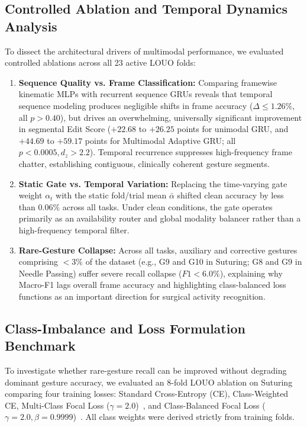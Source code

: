 \documentclass[10pt,journal]{IEEEtran}
\begin{document}
\subsection{Controlled Ablation and Temporal Dynamics Analysis}
To dissect the architectural drivers of multimodal performance, we evaluated controlled ablations across all 23 active LOUO folds:
\begin{enumerate}
    \item \textbf{Sequence Quality vs. Frame Classification:} Comparing framewise kinematic MLPs with recurrent sequence GRUs reveals that temporal sequence modeling produces negligible shifts in frame accuracy ($\Delta \le 1.26\%$, all $p > 0.40$), but drives an overwhelming, universally significant improvement in segmental Edit Score ($+22.68$ to $+26.25$ points for unimodal GRU, and $+44.69$ to $+59.17$ points for Multimodal Adaptive GRU; all $p < 0.0005, d_z > 2.2$). Temporal recurrence suppresses high-frequency frame chatter, establishing contiguous, clinically coherent gesture segments.
    \item \textbf{Static Gate vs. Temporal Variation:} Replacing the time-varying gate weight $\alpha_t$ with the static fold/trial mean $\bar{\alpha}$ shifted clean accuracy by less than $0.06\%$ across all tasks. Under clean conditions, the gate operates primarily as an availability router and global modality balancer rather than a high-frequency temporal filter.
    \item \textbf{Rare-Gesture Collapse:} Across all tasks, auxiliary and corrective gestures comprising $<3\%$ of the dataset (e.g., G9 and G10 in Suturing; G8 and G9 in Needle Passing) suffer severe recall collapse ($F1 < 6.0\%$), explaining why Macro-F1 lags overall frame accuracy and highlighting class-balanced loss functions as an important direction for surgical activity recognition.
\end{enumerate}

\subsection{Class-Imbalance and Loss Formulation Benchmark}
To investigate whether rare-gesture recall can be improved without degrading dominant gesture accuracy, we evaluated an 8-fold LOUO ablation on Suturing comparing four training losses: Standard Cross-Entropy (CE), Class-Weighted CE, Multi-Class Focal Loss ($\gamma=2.0$)~\cite{lin2017focal}, and Class-Balanced Focal Loss ($\gamma=2.0, \beta=0.9999$)~\cite{cui2019class}. All class weights were derived strictly from training folds.
\end{document}
